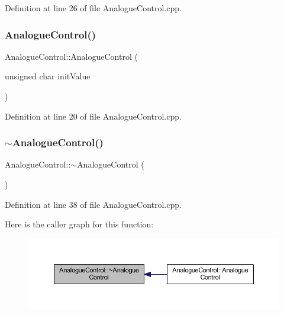 Definition at line 26 of file Analogue\+Control.\+cpp.

\mbox{\label{class_analogue_control_af5c00f8da0a5b050a6552e4d111bfe39}} 
\subsubsection{\texorpdfstring{Analogue\+Control()}{AnalogueControl()}\hspace{0.1cm}{\footnotesize\ttfamily [3/3]}}
{\footnotesize\ttfamily Analogue\+Control\+::\+Analogue\+Control (\begin{DoxyParamCaption}\item[{unsigned char}]{init\+Value }\end{DoxyParamCaption})}



Definition at line 20 of file Analogue\+Control.\+cpp.

\mbox{\label{class_analogue_control_a08a12843e8a0a1cb8a0ef9da3865a453}} 
\subsubsection{\texorpdfstring{$\sim$\+Analogue\+Control()}{~AnalogueControl()}}
{\footnotesize\ttfamily Analogue\+Control\+::$\sim$\+Analogue\+Control (\begin{DoxyParamCaption}{ }\end{DoxyParamCaption})}



Definition at line 38 of file Analogue\+Control.\+cpp.

Here is the caller graph for this function\+:
\nopagebreak
\begin{figure}[H]
\begin{center}
\leavevmode
\includegraphics[width=350pt]{dc/daa/class_analogue_control_a08a12843e8a0a1cb8a0ef9da3865a453_icgraph}
\end{center}
\end{figure}


